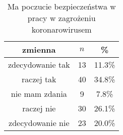 \begin{table}[H]
\caption{Ma poczucie bezpieczeństwa w pracy w zagrożeniu koronarowirusem}
\centering
\begin{tabular}{ | c | c | c |}
\hline
zmienna & $n$ & \% \\
\hline
zdecydowanie tak  &  13  & 11.3\% \\
\hline
raczej tak  &  40  & 34.8\% \\
\hline
nie mam zdania  &  9  & 7.8\% \\
\hline
raczej nie  &  30  & 26.1\% \\
\hline
zdecydowanie nie  &  23  & 20.0\% \\
\hline
\end{tabular}
\label{tab:Q18}
\end{table}
